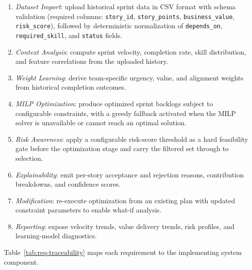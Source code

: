 \documentclass[conference]{IEEEtran}
\begin{document}
\begin{enumerate}[leftmargin=*,itemsep=1pt,topsep=2pt,label={F\arabic*.}]
	\item \emph{Dataset Import}: upload historical sprint data in CSV format with
	      schema validation (required columns: \texttt{story\_id},
	      \texttt{story\_points}, \texttt{business\_value}, \texttt{risk\_score}),
	      followed by deterministic normalization of \texttt{depends\_on},
	      \texttt{required\_skill}, and \texttt{status} fields.
	\item \emph{Context Analysis}: compute sprint velocity, completion rate, skill
	      distribution, and feature correlations from the uploaded history.
	\item \emph{Weight Learning}: derive team-specific urgency, value, and alignment
	      weights from historical completion outcomes.
	\item \emph{MILP Optimization}: produce optimized sprint backlogs subject to
	      configurable constraints, with a greedy fallback activated when the MILP
	      solver is unavailable or cannot reach an optimal solution.
	\item \emph{Risk Awareness}: apply a configurable risk-score threshold as a hard
	      feasibility gate before the optimization stage and carry the filtered set
	      through to selection.
	\item \emph{Explainability}: emit per-story acceptance and rejection reasons,
	      contribution breakdowns, and confidence scores.
	\item \emph{Modification}: re-execute optimization from an existing plan with
	      updated constraint parameters to enable what-if analysis.
	\item \emph{Reporting}: expose velocity trends, value delivery trends, risk
	      profiles, and learning-model diagnostics.
\end{enumerate}

Table~\ref{tab:req-traceability} maps each requirement to the implementing system
component.
\end{document}

